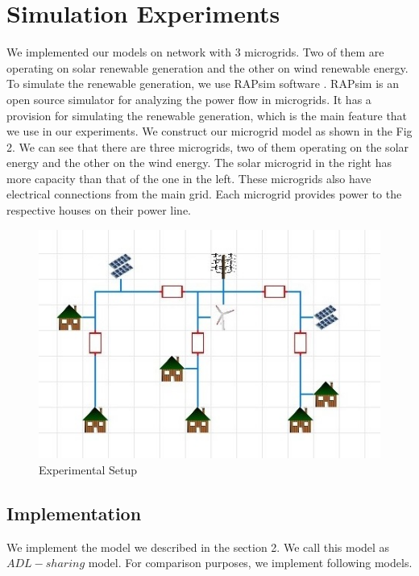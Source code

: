 \section{Simulation Experiments}
We implemented our models on network with 3 microgrids. Two of them are operating on solar renewable generation and the other on wind renewable energy. To simulate the renewable generation, we use RAPsim software \cite{rapsim}. RAPsim is an open source simulator for analyzing the power flow in microgrids. It has a provision for simulating the renewable generation, which is the main feature that we use in our experiments. We construct our microgrid model as shown in the Fig 2. We can see that there are three microgrids, two of them operating on the solar energy and the other on the wind energy. The solar microgrid in the right has more capacity than that of the one in the left. These microgrids also have electrical connections from the main grid. Each microgrid provides power to the respective houses on their power line. 


\begin{figure}[thbp] \label{exp}
	\centering
	\includegraphics[scale = 0.6]{experimental_setup.jpg}
		\caption{Experimental Setup}
\end{figure}


\subsection{Implementation}

We implement the model we described in the section 2. We call this model as $ADL-sharing$ model. For comparison purposes, we implement following models. 


